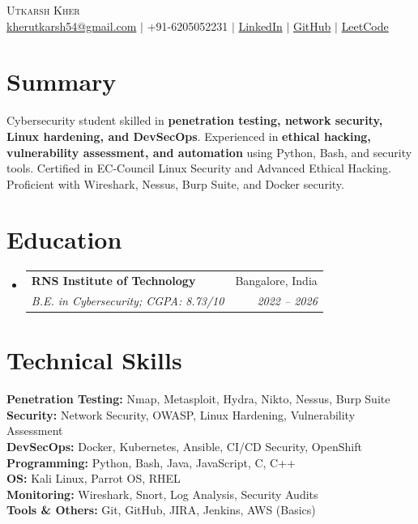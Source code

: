 \documentclass[letterpaper,10pt]{article}
\makeatletter
\newcommand{\resumeSubheading}[4]{
  \vspace{-2pt}\item
    \begin{tabular*}{0.97\textwidth}[t]{l@{\extracolsep{\fill}}r}
      \textbf{#1} & #2 \\
      \textit{\small#3} & \textit{\small #4} \\
    \end{tabular*}\vspace{-7pt}
}
\makeatother
\begin{document}
\begin{center}
    {\Huge \scshape Utkarsh Kher} \\ \vspace{2pt}
    \small
    \href{mailto:kherutkarsh54@gmail.com}{kherutkarsh54@gmail.com} $|$
    +91-6205052231 $|$
    \href{https://www.linkedin.com/in/utkarsh-kher-654a1a282/}{LinkedIn} $|$
    \href{https://github.com/utkarshun}{GitHub} $|$
    \href{https://leetcode.com/u/utkarshkher/}{LeetCode}
\end{center}

\section{Summary}
\small{
Cybersecurity student skilled in \textbf{penetration testing, network security, Linux hardening, and DevSecOps}. Experienced in \textbf{ethical hacking, vulnerability assessment, and automation} using Python, Bash, and security tools. Certified in EC-Council Linux Security and Advanced Ethical Hacking. Proficient with Wireshark, Nessus, Burp Suite, and Docker security.
}

\section{Education}
\begin{itemize}[leftmargin=0.15in, label={}]
  \resumeSubheading
    {RNS Institute of Technology}{Bangalore, India}
    {B.E. in Cybersecurity; CGPA: 8.73/10}{2022 -- 2026}
\end{itemize}

\section{Technical Skills}
\begin{itemize}[leftmargin=0.15in, label={}]
    \small{\item{
     \textbf{Penetration Testing:} Nmap, Metasploit, Hydra, Nikto, Nessus, Burp Suite \\
     \textbf{Security:} Network Security, OWASP, Linux Hardening, Vulnerability Assessment \\
     \textbf{DevSecOps:} Docker, Kubernetes, Ansible, CI/CD Security, OpenShift \\
     \textbf{Programming:} Python, Bash, Java, JavaScript, C, C++ \\
     \textbf{OS:} Kali Linux, Parrot OS, RHEL \\
     \textbf{Monitoring:} Wireshark, Snort, Log Analysis, Security Audits \\
     \textbf{Tools \& Others:} Git, GitHub, JIRA, Jenkins, AWS (Basics)
    }}
\end{itemize}
\end{document}
